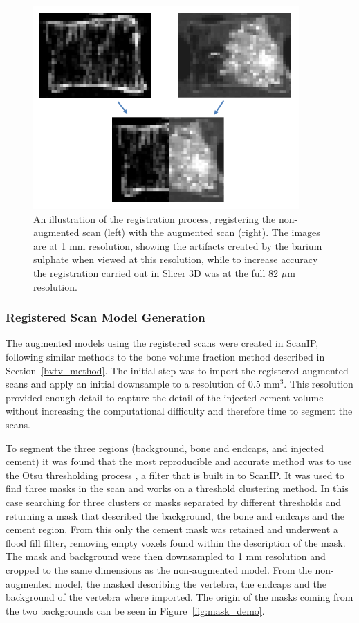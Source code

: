 \begin{figure}[ht!]
  \centering
  \includegraphics[width=4in]{Chapters/Chapter_HT_images/reg_demo.png}
  \caption{An illustration of the registration process, registering the non-augmented scan (left) with the augmented scan (right). The images are at 1 mm resolution, showing the artifacts created by the barium sulphate when viewed at this resolution, while to increase accuracy the registration carried out in Slicer 3D was at the full 82 $\mu$m resolution.}
  \label{fig:reg_demo}
\end{figure}

\subsubsection{Registered Scan Model Generation}

The augmented models using the registered scans were created in ScanIP, following similar methods to the bone volume fraction method described in Section~\ref{bvtv_method}.
The initial step was to import the registered augmented scans and apply an initial downsample to a resolution of 0.5 mm$^3$.
This resolution provided enough detail to capture the detail of the injected cement volume without increasing the computational difficulty and therefore time to segment the scans.

To segment the three regions (background, bone and endcaps, and injected cement) it was found that the most reproducible and accurate method was to use the Otsu thresholding process \cite{sezgin2004survey}, a filter that is built in to ScanIP\@.
It was used to find three masks in the scan and works on a threshold clustering method.
In this case searching for three clusters or masks separated by different thresholds and returning a mask that described the background, the bone and endcaps and the cement region.
From this only the cement mask was retained and underwent a flood fill filter, removing empty voxels found within the description of the mask.
The mask and background were then downsampled to 1 mm resolution and cropped to the same dimensions as the non-augmented model.
From the non-augmented model, the masked describing the vertebra, the endcaps and the background of the vertebra where imported.
The origin of the masks coming from the two backgrounds can be seen in Figure~\ref{fig:mask_demo}.

